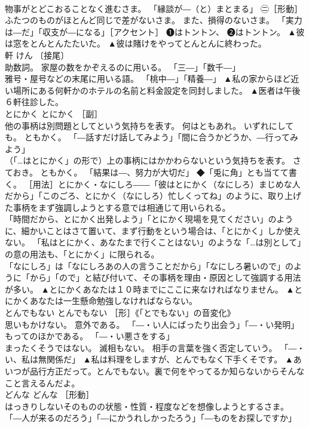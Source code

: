 \documentclass[8pt]{extreport}
\begin{document}
\begin{CJK}{UTF8}{min}
\\	物事がとどこおることなく進むさま。 「縁談が―（と）まとまる」 ㊁［形動］ふたつのものがほとんど同じで差がないさま。 また、損得のないさま。 「実力は―だ」「収支が―になる」［アクセント］ ❶はトントン、 ❷はトントン。	▲彼は窓をとんとんたたいた。 ▲彼は賭けをやってとんとんに終わった。
\\	軒	けん	〔接尾〕 
\\	助数詞。 家屋の数をかぞえるのに用いる。 「三―」「数千―」 
\\	雅号・屋号などの末尾に用いる語。 「桃中―」「精養―」	▲私の家からほど近い場所にある何軒かのホテルの名前と料金設定を同封しました。 ▲医者は午後６軒往診した。
\\	とにかく	とにかく	［副］ 
\\	他の事柄は別問題としてという気持ちを表す。 何はともあれ。 いずれにしても。 ともかく。 「―話すだけ話してみよう」「間に合うかどうか、―行ってみよう」 
\\	（「…はとにかく」の形で）上の事柄にはかかわらないという気持ちを表す。 さておき。 ともかく。 「結果は―、努力が大切だ」 ◆「兎に角」とも当てて書く。 ［用法］とにかく・なにしろ――「彼はとにかく（なにしろ）まじめな人だから」「このごろ、とにかく（なにしろ）忙しくってね」のように、取り上げた事柄をまず強調しようとする意では相通じて用いられる。 
\\	「時間だから、とにかく出発しよう」「とにかく現場を見てください」のように、細かいことはさて置いて、まず行動をという場合は、「とにかく」しか使えない。 「私はとにかく、あなたまで行くことはない」のような「…は別として」の意の用法も、「とにかく」に限られる。 
\\	「なにしろ」は「なにしろあの人の言うことだから」「なにしろ暑いので」のように「から」「ので」と結び付いて、その事柄を理由・原因として強調する用法が多い。	▲とにかくあなたは１０時までにここに来なければなりません。 ▲とにかくあなたは一生懸命勉強しなければならない。
\\	とんでもない	とんでもない	［形］《「とでもない」の音変化》 
\\	思いもかけない。 意外である。 「―・い人にばったり出会う」「―・い発明」 
\\	もってのほかである。 「―・い悪さをする」 
\\	まったくそうではない。 滅相もない。 相手の言葉を強く否定していう。 「―・い、私は無関係だ」	▲私は料理をしますが、とんでもなく下手くそです。 ▲あいつが品行方正だって。とんでもない。裏で何をやってるか知らないからそんなこと言えるんだよ。
\\	どんな	どんな	［形動］ 
\\	はっきりしないそのものの状態・性質・程度などを想像しようとするさま。 「―人が来るのだろう」「―にかうれしかったろう」「―ものをお探しですか」 

\end{CJK}
\end{document}
